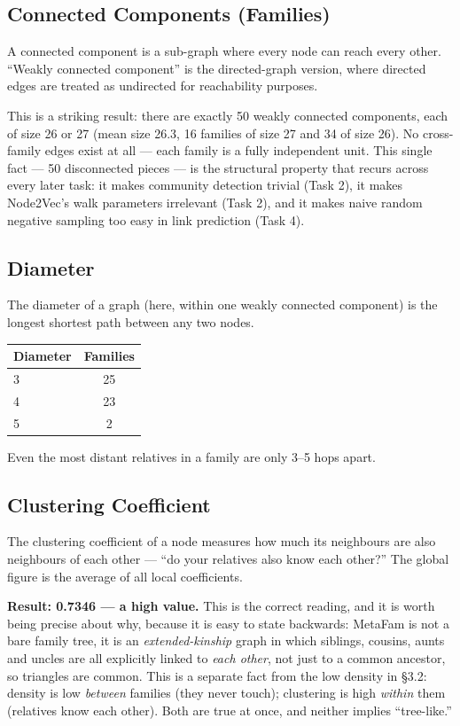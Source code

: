 \documentclass[11pt,a4paper]{article}
\begin{document}
\subsection{Connected Components (Families)}

A connected component is a sub-graph where every node can reach every
other. ``Weakly connected component'' is the directed-graph version,
where directed edges are treated as undirected for reachability purposes.

This is a striking result: there are exactly 50 weakly connected
components, each of size 26 or 27 (mean size 26.3, 16 families of size 27
and 34 of size 26). No cross-family edges exist at all --- each family is
a fully independent unit. This single fact --- 50 disconnected pieces ---
is the structural property that recurs across every later task: it makes
community detection trivial (Task 2), it makes Node2Vec's walk parameters
irrelevant (Task 2), and it makes naive random negative sampling too easy
in link prediction (Task 4).

\subsection{Diameter}

The diameter of a graph (here, within one weakly connected component) is
the longest shortest path between any two nodes.

\begin{center}
\begin{tabular}{lc}
\toprule
\textbf{Diameter} & \textbf{Families} \\
\midrule
3 & 25 \\
4 & 23 \\
5 & 2 \\
\bottomrule
\end{tabular}
\end{center}

Even the most distant relatives in a family are only 3--5 hops apart.

\subsection{Clustering Coefficient}

The clustering coefficient of a node measures how much its neighbours are
also neighbours of each other --- ``do your relatives also know each
other?'' The global figure is the average of all local coefficients.

\textbf{Result: 0.7346 --- a high value.} This is the correct reading, and
it is worth being precise about why, because it is easy to state
backwards: MetaFam is not a bare family tree, it is an
\emph{extended-kinship} graph in which siblings, cousins, aunts and
uncles are all explicitly linked to \emph{each other}, not just to a
common ancestor, so triangles are common. This is a separate fact from
the low density in \S3.2: density is low \emph{between} families (they
never touch); clustering is high \emph{within} them (relatives know each
other). Both are true at once, and neither implies ``tree-like.''
\end{document}
